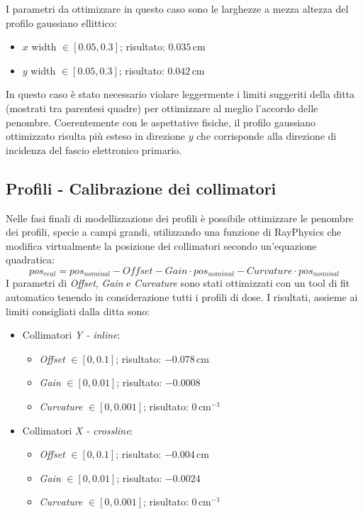 I parametri da ottimizzare in questo caso sono le larghezze a mezza altezza del profilo gaussiano ellittico:
\begin{itemize}
\item $x$ width $\in [0.05,0.3]$; risultato: $0.035\,$cm
\item $y$ width $\in [0.05,0.3]$; risultato: $0.042\,$cm
\end{itemize}
In questo caso è stato necessario violare leggermente i limiti suggeriti della ditta (mostrati tra parentesi quadre) per ottimizzare al meglio l'accordo delle penombre.
Coerentemente con le aspettative fisiche, il profilo gaussiano ottimizzato risulta più esteso in direzione $y$ che corrisponde alla direzione di incidenza del fascio elettronico primario.

\subsection{Profili - Calibrazione dei collimatori}
Nelle fasi finali di modellizzazione dei profili è possibile ottimizzare le penombre dei profili, specie a campi grandi, utilizzando una funzione di RayPhysics che modifica virtualmente la posizione dei collimatori secondo un'equazione quadratica:
\begin{equation}
pos_{real} = pos_{nominal} - Offset - Gain\cdot pos_{nominal} - Curvature \cdot pos_{nominal}
\label{eq:offset}
\end{equation}
I parametri di \textit{Offset}, \textit{Gain} e \textit{Curvature} sono stati ottimizzati con un tool di fit automatico tenendo in considerazione tutti i profili di dose. I risultati, assieme ai limiti consigliati dalla ditta sono:
\begin{itemize}
\item Collimatori \textit{Y - inline}:
\begin{itemize}
\item \textit{Offset} $\in [0,0.1]$; risultato: $-0.078\,$cm
\item \textit{Gain} $\in [0,0.01]$; risultato: $-0.0008\,$
\item \textit{Curvature} $\in [0,0.001]$; risultato: $0\,$cm$^{-1}$
\end{itemize}
\item Collimatori \textit{X - crossline}:
\begin{itemize}
\item \textit{Offset} $\in [0,0.1]$; risultato: $-0.004\,$cm
\item \textit{Gain} $\in [0,0.01]$; risultato: $-0.0024\,$
\item \textit{Curvature} $\in [0,0.001]$; risultato: $0\,$cm$^{-1}$
\end{itemize}
\end{itemize}

